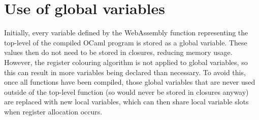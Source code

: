 \section{Use of global variables}
Initially, every variable defined by the WebAssembly function representing the top-level of the compiled OCaml program is stored as a global variable. These values then do not need to be stored in closures, reducing memory usage. However, the register colouring algorithm is not applied to global variables, so this can result in more variables being declared than necessary. To avoid this, once all functions have been compiled, those global variables that are never used outside of the top-level function (so would never be stored in closures anyway) are replaced with new local variables, which can then share local variable slots when register allocation occurs.









